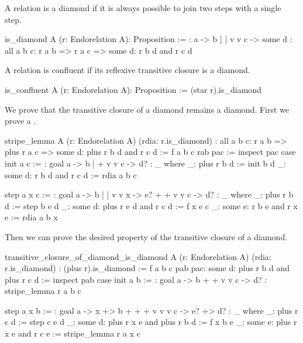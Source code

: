 A relation is a diamond if it is always possible to join two steps with a
single step.

\begin{alba}
  is_diamond A (r: Endorelation A): Proposition :=
      {:   a  ->  b
           |      |
           v      v
           c  -> some d :}
    all a b c:
      r a b
      => r a c
      => some d: r b d and r c d
\end{alba}


A relation is confluent if its reflexive transitive closure is a diamond.

\begin{alba}
  is_confluent A (r: Endorelation A): Proposition :=
    (star r).is_diamond
\end{alba}



We prove that the transitive closure of a diamond remains a diamond. First we
prove a .


\begin{alba}
   stripe_lemma
     A
     (r: Endorelation A)
     (rdia: r.is_diamond)
     : all a b c:
         r a b
         => plus r a c
         => some d: plus r b d and r c d :=
       f a b c rab pac :=
         inspect pac case
           init a c :=
             {: goal a  ->  b
                     |      +
                     v      v
                     c  ->  d? :}
             _ where
               _: plus r b d := init b d
               _: some d: r b d and r c d := rdia a b c

           step a x c :=
             {: goal a   ->   b
                     |        |
                     v        v
                     x   ->   e?
                     +        +
                     v        v
                     c  ->    d?  :}
             _ where
               _: plus r b d := step b e d
               _: some d: plus r e d and r c d := f x e c
               _: some e: r b e and r x e := rdia a b x
\end{alba}

Then we can prove the desired property of the transitive closure of a diamond.

\begin{alba}
  transitive_closure_of_diamond_is_diamond
    A
    (r: Endorelation A)
    (rdia: r.is_diamond)
    : (plus r).is_diamond :=
      f a b c pab pac: some d: plus r b d and plus r c d :=
        inspect pab case
          init a b :=
            {: goal  a -> b
                     +    +
                     v    v
                     c -> d?  :}
            stripe_lemma r a b c

          step a x b :=
            {: goal a -> x  +> b
                    +    +     +
                    v    v     v
                    c -> e? +> d? :}
            _ where
               _: plus r c d := step c e d
               _: some d: plus r x e and plus r b d := f x b e
               _: some e: plus r x e and r c e :=  stripe_lemma r a x c
\end{alba}
%










